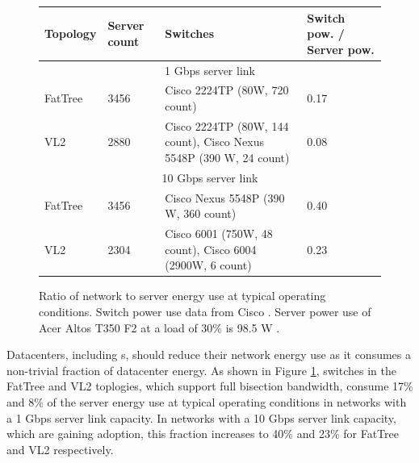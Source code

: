 \begin{figure}[t]
\centering
\small
\begin{tabular}{| m{1.5cm} | m{1.5cm} | m{7cm} | m{3cm} |}
\hline
Topology & Server count & Switches & Switch pow. / Server pow. \\ \hline
\multicolumn{4}{|c|}{1 Gbps server link}                                                  \\\hline
FatTree  & 3456        & Cisco 2224TP (80W, 720 count) & 0.17                                      \\\hline
VL2        & 2880        & Cisco  2224TP (80W, 144 count), Cisco Nexus 5548P (390 W, 24 count)                               & 0.08                                      \\ \hline
\multicolumn{4}{|c|}{10 Gbps server link}                                                  \\\hline
FatTree  & 3456        & Cisco Nexus 5548P (390 W, 360 count) & 0.40                                      \\\hline
VL2        & 2304        & Cisco 6001 (750W, 48 count), Cisco 6004 (2900W, 6 count) & 0.23                                      \\ \hline
\end{tabular}

\caption{Ratio of network to server energy use at typical operating conditions. Switch power use data from Cisco \cite{cisco-dc-switches}. Server power use  of Acer Altos T350 F2 at a load of 30\% is 98.5 W \cite{spec}.}
\label{fig:network-power-use}
\end{figure}


Datacenters, including \cdc s, should reduce their network energy use as it consumes a non-trivial fraction of datacenter energy. As shown in Figure \ref{fig:network-power-use},  switches in the FatTree \cite{fattree} and VL2 \cite{vl2} toplogies, which support full bisection bandwidth, consume 17\% and 8\% of the server energy use  at typical operating conditions in networks with a 1 Gbps server link capacity. In networks with a 10 Gbps server link capacity, which are gaining adoption, this fraction increases to 40\% and 23\% for FatTree and VL2 respectively. 


